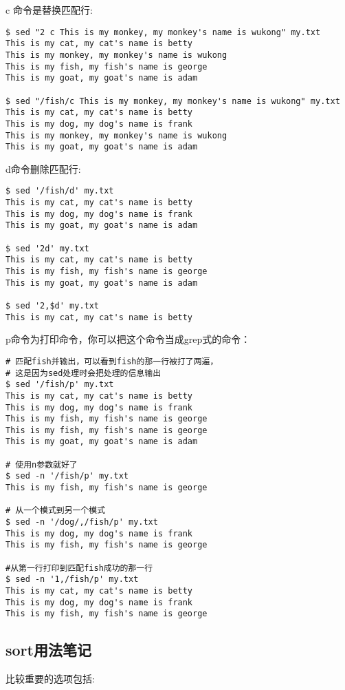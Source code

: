 c 命令是替换匹配行:
\begin{verbatim}
$ sed "2 c This is my monkey, my monkey's name is wukong" my.txt
This is my cat, my cat's name is betty
This is my monkey, my monkey's name is wukong
This is my fish, my fish's name is george
This is my goat, my goat's name is adam
 
$ sed "/fish/c This is my monkey, my monkey's name is wukong" my.txt
This is my cat, my cat's name is betty
This is my dog, my dog's name is frank
This is my monkey, my monkey's name is wukong
This is my goat, my goat's name is adam
\end{verbatim}


d命令删除匹配行:
\begin{verbatim}
$ sed '/fish/d' my.txt
This is my cat, my cat's name is betty
This is my dog, my dog's name is frank
This is my goat, my goat's name is adam
 
$ sed '2d' my.txt
This is my cat, my cat's name is betty
This is my fish, my fish's name is george
This is my goat, my goat's name is adam
 
$ sed '2,$d' my.txt
This is my cat, my cat's name is betty
\end{verbatim}


p命令为打印命令，你可以把这个命令当成grep式的命令：
\begin{verbatim}
# 匹配fish并输出，可以看到fish的那一行被打了两遍，
# 这是因为sed处理时会把处理的信息输出
$ sed '/fish/p' my.txt
This is my cat, my cat's name is betty
This is my dog, my dog's name is frank
This is my fish, my fish's name is george
This is my fish, my fish's name is george
This is my goat, my goat's name is adam
 
# 使用n参数就好了
$ sed -n '/fish/p' my.txt
This is my fish, my fish's name is george
 
# 从一个模式到另一个模式
$ sed -n '/dog/,/fish/p' my.txt
This is my dog, my dog's name is frank
This is my fish, my fish's name is george
 
#从第一行打印到匹配fish成功的那一行
$ sed -n '1,/fish/p' my.txt
This is my cat, my cat's name is betty
This is my dog, my dog's name is frank
This is my fish, my fish's name is george
\end{verbatim}



\subsection{sort用法笔记}
比较重要的选项包括:

